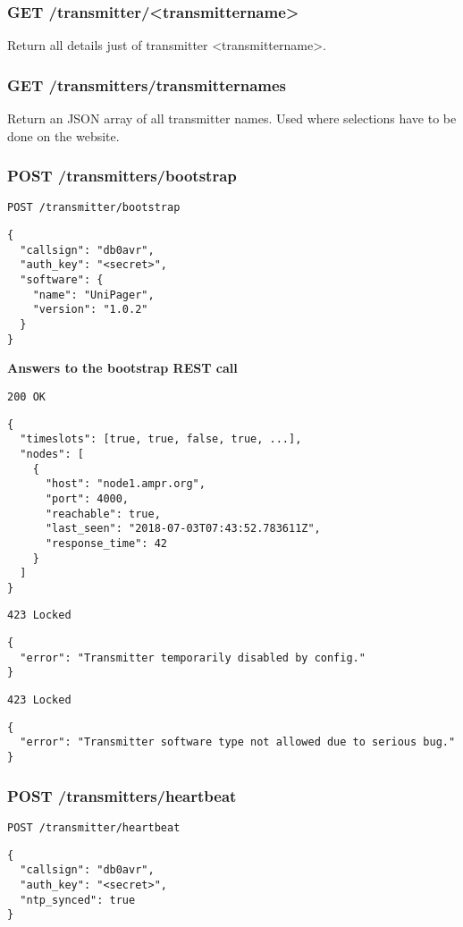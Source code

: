 \subsubsection{GET /transmitter/<transmittername>}
\label{protocoldef:microservicesapi:database:gettransmittername}
Return all details just of transmitter <transmittername>.

\subsubsection{GET /transmitters/transmitternames}
Return an JSON array of all transmitter names. Used where selections have to be done on the website.

\subsubsection{POST /transmitters/bootstrap}
\label{protcoldef:transmitters:bootstrap}
\texttt{POST /transmitter/bootstrap}
\begin{lstlisting}
{
  "callsign": "db0avr",
  "auth_key": "<secret>",
  "software": {
    "name": "UniPager",
    "version": "1.0.2"
  }
}
\end{lstlisting}

\textbf{Answers to the bootstrap REST call}

\texttt{200 OK}
\begin{lstlisting}
{
  "timeslots": [true, true, false, true, ...],
  "nodes": [
    {
      "host": "node1.ampr.org",
      "port": 4000,
      "reachable": true,
      "last_seen": "2018-07-03T07:43:52.783611Z",
      "response_time": 42
    }
  ]
}
\end{lstlisting}

\texttt{423 Locked}
\begin{lstlisting}
{
  "error": "Transmitter temporarily disabled by config."
}
\end{lstlisting}

\texttt{423 Locked}
\begin{lstlisting}
{
  "error": "Transmitter software type not allowed due to serious bug."
}
\end{lstlisting}


\subsubsection{POST /transmitters/heartbeat}
\texttt{POST /transmitter/heartbeat}
\begin{lstlisting}
{
  "callsign": "db0avr",
  "auth_key": "<secret>",
  "ntp_synced": true
}
\end{lstlisting}

